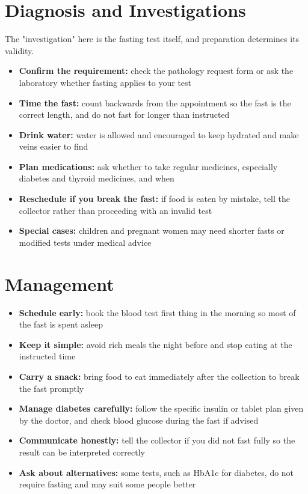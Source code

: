 \section*{Diagnosis and Investigations}
The "investigation" here is the fasting test itself, and preparation determines its validity.
\begin{itemize}
    \item \textbf{Confirm the requirement:} check the pathology request form or ask the laboratory whether fasting applies to your test
    \item \textbf{Time the fast:} count backwards from the appointment so the fast is the correct length, and do not fast for longer than instructed
    \item \textbf{Drink water:} water is allowed and encouraged to keep hydrated and make veins easier to find
    \item \textbf{Plan medications:} ask whether to take regular medicines, especially diabetes and thyroid medicines, and when
    \item \textbf{Reschedule if you break the fast:} if food is eaten by mistake, tell the collector rather than proceeding with an invalid test
    \item \textbf{Special cases:} children and pregnant women may need shorter fasts or modified tests under medical advice
\end{itemize}

\section*{Management}
\begin{itemize}
    \item \textbf{Schedule early:} book the blood test first thing in the morning so most of the fast is spent asleep
    \item \textbf{Keep it simple:} avoid rich meals the night before and stop eating at the instructed time
    \item \textbf{Carry a snack:} bring food to eat immediately after the collection to break the fast promptly
    \item \textbf{Manage diabetes carefully:} follow the specific insulin or tablet plan given by the doctor, and check blood glucose during the fast if advised
    \item \textbf{Communicate honestly:} tell the collector if you did not fast fully so the result can be interpreted correctly
    \item \textbf{Ask about alternatives:} some tests, such as HbA1c for diabetes, do not require fasting and may suit some people better
\end{itemize}

